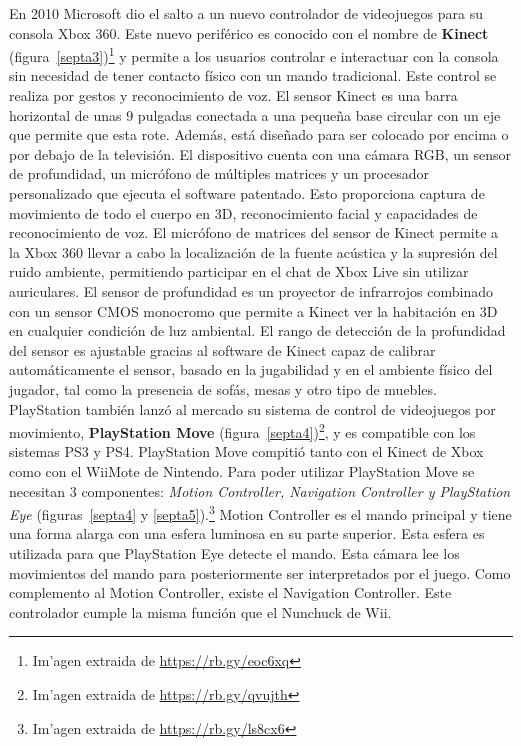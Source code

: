 En 2010 Microsoft dio el salto a un nuevo controlador de videojuegos para su consola Xbox 360. Este nuevo perif\'erico es conocido con el nombre de \textbf{Kinect} (figura~\ref{septa3})\footnote{Im'agen extraida de \url{https://rb.gy/eoc6xq}} y permite a los usuarios controlar e interactuar con la consola sin necesidad de tener contacto f\'isico con un mando tradicional. Este control se realiza por gestos y reconocimiento de voz. El sensor Kinect es una barra horizontal de unas 9 pulgadas conectada a una peque\~na base circular con un eje que permite que esta rote. Adem\'as, est\'a dise\~nado para ser colocado por encima o por debajo de la televisi\'on. El dispositivo cuenta con una c\'amara RGB, un sensor de profundidad, un micr\'ofono de m\'ultiples matrices y un procesador personalizado que ejecuta el software patentado. Esto proporciona captura de movimiento de todo el cuerpo en 3D, reconocimiento facial y capacidades de reconocimiento de voz. El micr\'ofono de matrices del sensor de Kinect permite a la Xbox 360 llevar a cabo la localizaci\'on de la fuente ac\'ustica y la supresi\'on del ruido ambiente, permitiendo participar en el chat de Xbox Live sin utilizar auriculares. El sensor de profundidad es un proyector de infrarrojos combinado con un sensor CMOS monocromo que permite a Kinect ver la habitaci\'on en 3D en cualquier condici\'on de luz ambiental. El rango de detecci\'on de la profundidad del sensor es ajustable gracias al software de Kinect capaz de calibrar autom\'aticamente el sensor, basado en la jugabilidad y en el ambiente f\'isico del jugador, tal como la presencia de sof\'as, mesas y otro tipo de muebles.\\

PlayStation tambi\'en lanz\'o al mercado su sistema de control de videojuegos por movimiento, \textbf{PlayStation Move} (figura~\ref{septa4})\footnote{Im'agen extraida de \url{https://rb.gy/qvujth}}, y es compatible con los sistemas PS3 y PS4. PlayStation Move compiti\'o tanto con el Kinect de Xbox como con el WiiMote de Nintendo. Para poder utilizar PlayStation Move se necesitan 3 componentes: \textit{Motion Controller, Navigation Controller y PlayStation Eye} (figuras~\ref{septa4} y \ref{septa5}).\footnote{Im'agen extraida de \url{https://rb.gy/ls8cx6}} Motion Controller es el mando principal y tiene una forma alarga con una esfera luminosa en su parte superior. Esta esfera es utilizada para que PlayStation Eye detecte el mando. Esta c\'amara lee los movimientos del mando para posteriormente ser interpretados por el juego. Como complemento al Motion Controller, existe el Navigation Controller. Este controlador cumple la misma funci\'on que el Nunchuck de Wii. \\

